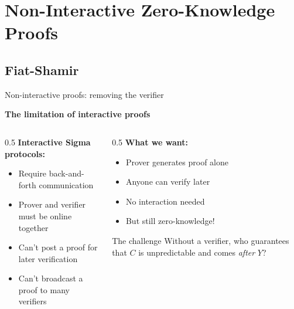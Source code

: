 \ifdefined\PRESENTATION\else\PassOptionsToClass{handout}{beamer}\fi\documentclass[aspectratio=169, lualatex]{beamer}
\begin{document}
\section{Non-Interactive Zero-Knowledge Proofs}

\subsection{Fiat-Shamir}

\begin{frame}{Non-interactive proofs: removing the verifier}
	\begin{center}
		\textbf{The limitation of interactive proofs}
	\end{center}
	\begin{columns}[c]
		\begin{column}{0.5\textwidth}
			\textbf{Interactive Sigma protocols:}
			\begin{itemize}
				\item Require back-and-forth communication
				\item Prover and verifier must be online together
				\item Can't post a proof for later verification
				\item Can't broadcast a proof to many verifiers
			\end{itemize}
		\end{column}
		\begin{column}{0.5\textwidth}
			\textbf{What we want:}
			\begin{itemize}
				\item Prover generates proof alone
				\item Anyone can verify later
				\item No interaction needed
				\item But still zero-knowledge!
			\end{itemize}
			\begin{alertblock}{The challenge}
				Without a verifier, who guarantees that $C$ is unpredictable and comes \textit{after} $Y$?
			\end{alertblock}
		\end{column}
	\end{columns}
\end{frame}
\end{document}
